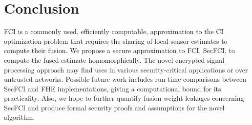 \documentclass[letterpaper, 10 pt, conference]{ieeeconf}  %
\begin{document}



\section{Conclusion} \label{sec:conclusion}
FCI is a commonly used, efficiently computable, approximation to the CI optimization problem that requires the sharing of local sensor estimates to compute their fusion. We propose a secure approximation to FCI, SecFCI, to compute the fused estimate homomorphically. The novel encrypted signal processing approach may find uses in various security-critical applications or over untrusted networks. Possible future work includes run-time comparisons between SecFCI and FHE implementations, giving a computational bound for its practicality. Also, we hope to further quantify fusion weight leakages concerning SecFCI and produce formal security proofs and assumptions for the novel algorithm.



\end{document}
